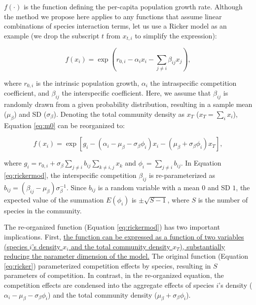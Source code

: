 \documentclass[12pt, class=article, crop=false]{standalone}
\begin{document}
$f(\cdot)$ is the function defining the per-capita population growth rate.
Although the method we propose here applies to any functions that assume linear combinations of species interaction terms, let us use a Ricker model as an example (we drop the subscript $t$ from $x_{t,i}$ to simplify the expression):

\begin{equation}
\label{eq:ricker}
f(x_{i}) = \exp(r_{0,i} - \alpha_i x_i - \sum_{j \ne i} \beta_{ij} x_{j}),
\end{equation}

where $r_{0,i}$ is the intrinsic population growth, $\alpha_{i}$ the intraspecific competition coefficient, and $\beta_{ij}$ the interspecific coefficient.
Here, we assume that $\beta_{ij}$ is randomly drawn from a given probability distribution, resulting in a sample mean ($\mu_{\beta}$) and SD ($\sigma_{\beta}$). 
Denoting the total community density as $x_T$ ($x_T = \sum_i x_i$), Equation \ref{eq:m0} can be reorganized to:

\begin{equation}
\label{eq:rickermod}
f(x_i) = \exp\left[g_i - (\alpha_i - \mu_{\beta} - \sigma_{\beta} \phi_i) x_i - (\mu_{\beta} + \sigma_{\beta} \phi_i) x_T \right],
\end{equation}

where $g_i = r_{0,i} + \sigma_{\beta} \sum_{j \ne i} b_{ij} \sum_{k \ne i, j} x_{k}$ and $\phi_i = \sum_{j \ne i} b_{ij}$.
In Equation \ref{eq:rickermod}, the interspecific competition $\beta_{ij}$ is re-parameterized as $b_{ij} = (\beta_{ij} - \mu_{\beta}) \sigma_{\beta}^{-1}$. Since $b_{ij}$ is a random variable with a mean $0$ and SD $1$, the expected value of the summation $E(\phi_i)$ is $\pm \sqrt{S - 1}$, where $S$ is the number of species in the community.

The re-organized function (Equation \ref{eq:rickermod}) has two important implications.
First, \ul{the function can be expressed as a function of two variables (species $i$'s density $x_i$ and the total community density $x_T$), substantially reducing the parameter dimension of the model.}
The original function (Equation \ref{eq:ricker}) parameterized competition effects by species, resulting in $S$ parameters of competition.
In contrast, in the re-organized equation, the competition effects are condensed into the aggregate effects of species $i$'s density ($\alpha_i - \mu_{\beta} - \sigma_{\beta} \phi_i$) and the total community density ($\mu_{\beta} + \sigma_{\beta} \phi_i$).
\end{document}
